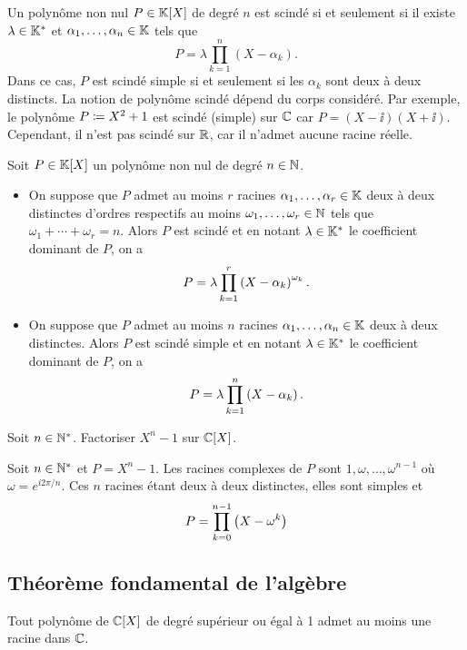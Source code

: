 \documentclass{magnolia}
\begin{document}
\begin{remarques}
\remarque Un polynôme non nul $P\in\polyK$ de degré $n$ est scindé si et seulement si il existe
  $\lambda\in\mathbb{K}^*$ et $\alpha_1,\ldots,\alpha_n\in\mathbb{K}$ tels que
  \[P=\lambda \prod_{k=1}^n (X-\alpha_k).\]
  Dans ce cas, $P$ est scindé simple si et seulement si les $\alpha_k$ sont deux à deux distincts.
\remarque La notion de polynôme scindé dépend du corps considéré. Par exemple,
  le polynôme $P\coloneqq X^2+1$ est scindé (simple) sur $\mathbb{C}$ car $P=(X-\ii)(X+\ii)$. Cependant, il
  n'est pas scindé sur $\mathbb{R}$, car il n'admet aucune racine réelle.
\end{remarques}

\begin{proposition}
Soit $P\in\polyK$ un polynôme non nul de degré $n\in\mathbb{N}$.
\begin{itemize}
\item On suppose que
$P$ admet au moins $r$ racines $\alpha_1,\ldots,\alpha_r\in\mathbb{K}$ deux à deux distinctes d'ordres
respectifs au moins $\omega_1,\ldots,\omega_r\in\mathbb{N}$ tels que $\omega_1+\cdots+\omega_r=n$.
Alors $P$ est scindé et en notant  $\lambda\in\mathbb{K}^*$ le coefficient dominant de $P$, on a
\[P=\lambda\prod_{k=1}^r \left(X-\alpha_k\right)^{\omega_k}.\]
\item On suppose que
$P$ admet au moins $n$ racines $\alpha_1,\ldots,\alpha_n\in\mathbb{K}$ deux à deux distinctes. Alors
$P$ est scindé simple et en notant $\lambda\in\mathbb{K}^*$ le coefficient dominant de $P$,
on a
\[P=\lambda\prod_{k=1}^n \left(X-\alpha_k\right).\]
\end{itemize}
\end{proposition}

\begin{exoUnique}
\exo Soit $n\in{\mathbb{N}^*}$. Factoriser $X^n-1$ sur $\polyC$.
  \begin{sol}
  Soit $n\in{\mathbb{N}^*}$ et $P=X^n-1$. Les racines complexes de $P$ sont
  $1,\omega,\ldots,\omega^{n-1}$ où $\omega=e^{i2\pi/n}$. Ces $n$ racines étant
  deux à deux distinctes, elles sont simples et
  \[P=\prod_{k=0}^{n-1} \left(X-\omega^k\right)\]  
  \end{sol}
\end{exoUnique}


\subsection{Théorème fondamental de l'algèbre}

\begin{theoreme}[nom={Théorème de d'\nom{Alembert}-\nom{Gauss}}]
Tout polynôme de $\polyC$ de degré supérieur ou égal à 1 admet au moins une
racine dans $\mathbb{C}$.  
\end{theoreme}
\end{document}
